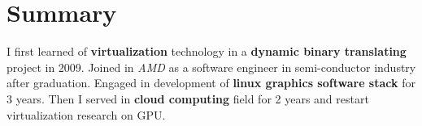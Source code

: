 \vspace{0.2cm}

\section{Summary}
\vspace{-0.2cm}
I first learned of \textbf{virtualization} technology in a
\textbf{dynamic binary translating} project in 2009. Joined in
\textit{AMD} as a software engineer in semi-conductor industry after
graduation. Engaged in development of \textbf{linux graphics software stack} for
3 years. Then I served in \textbf{cloud computing} field for 2 years and restart virtualization research on GPU.
